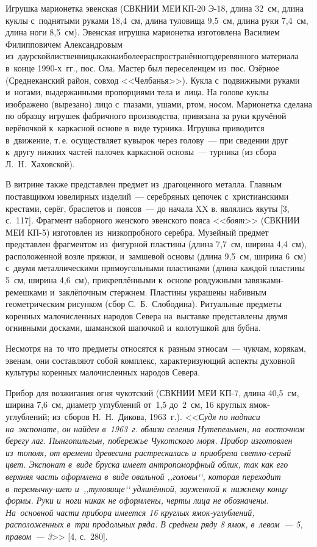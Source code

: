 Игрушка марионетка эвенская (СВКНИИ МЕИ\,КП-20 Э-18, длина 32~см, длина куклы с~поднятыми руками 18,4~см, длина туловища 9,5~см, длина руки 7,4~см, длина ноги 8,5~см). Эвенская игрушка марионетка изготовлена Василием Филипповичем Александровым из~даурской\hspace{6pt}лиственницы\hspace{6pt}как\hspace{6pt}наиболее\hspace{6pt}распространённого\hspace{6pt}деревянного материала в~конце 1990-х~гг., пос. Ола. Мастер был переселенцем из~пос. Озёрное (Среднеканский район, совход <<Челбанья>>). Кукла с~подвижными руками и~ногами, выдержанными пропорциями тела и~лица. На голове куклы изображено (вырезано) лицо с~глазами, ушами, ртом, носом. Марионетка сделана по образцу игрушек фабричного производства, привязана за руки кручёной верёвочкой к~каркасной основе в~виде турника. Игрушка приводится в~движение, т.\,е. осуществляет кувырок через голову~--- при сведении друг к~другу нижних частей палочек каркасной основы~--- турника (из сбора Л.~Н.~Хаховской).

В витрине также представлен предмет из~драгоценного металла. Главным поставщиком ювелирных изделий~--- серебряных цепочек с~христианскими крестами, серёг, браслетов и~поясов~--- до начала XX в. являлись якуты [3, с.~117]. Фрагмент наборного женского эвенского пояса <<\textit{боят}>> (СВКНИИ МЕИ КП-5) изготовлен из~низкопробного серебра. Музейный предмет представлен фрагментом из~фигурной пластины (длина 7,7~см, ширина 4,4~см), расположенной возле пряжки, и~замшевой основы (длина 9,5~см, ширина 6~см) с~двумя металлическими прямоугольными пластинами (длина каждой пластины 5~см, ширина 4,6~см), прикреплёнными к~основе ровдужными завязками-ремешками и~заклёпочным стержнем. Пластины украшены набивным геометрическим рисунком (сбор \enlargethispage{2\baselineskip}С.~Б.~Слободина).
\clearpage
Ритуальные предметы коренных малочисленных народов Севера на~выставке представлены двумя огнивными досками, шаманской шапочкой и~колотушкой для бубна.

Несмотря на~то что предметы относятся к~разным этносам~--- чукчам, корякам, эвенам, они составляют собой комплекс, характеризующий аспекты духовной культуры коренных малочисленных народов Севера.

Прибор для возжигания огня чукотский (СВКНИИ МЕИ КП-7, длина 40,5~см, ширина 7,6~см, диаметр углублений от~1,5 до~2~см, 16 круглых ямок-углублений; из~сборов Н.~Н.~Дикова, 1963~г.). <<\textit{Судя по надписи на~экспонате, он найден в~1963~г. вблизи селения Нутепельмен, на~восточном берегу лаг. Пынгопильгын, побережье Чукотского моря. Прибор изготовлен из~тополя, от времени древесина растрескалась и~приобрела светло-серый цвет. Экспонат в~виде бруска имеет антропоморфный облик, так как его верхняя часть оформлена в~виде овальной ,,\textit{головы}‘‘, которая переходит в~перемычку-шею и~,,\textit{туловище}‘‘ удлинённой, зауженной к~нижнему концу формы. Руки и~ноги никак не оформлены, черты лица не обозначены. На~основной части прибора имеется 16 круглых ямок-углублений, расположенных в~три продольных ряда. В среднем ряду 8 ямок, в~левом~--- 5, правом~--- 3}>> [4, с.~280].

